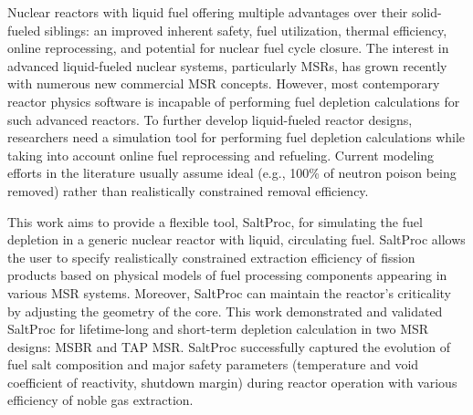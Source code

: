 Nuclear reactors with liquid fuel offering multiple advantages over their 
solid-fueled siblings: an improved inherent safety, fuel utilization, thermal 
efficiency, online reprocessing, and potential for nuclear fuel cycle closure. 
The interest in advanced liquid-fueled nuclear 
systems, particularly \glspl{MSR}, has grown recently with numerous new 
commercial \gls{MSR} concepts. 
However, most contemporary reactor physics software is incapable of performing 
fuel depletion calculations for such advanced reactors. To further 
develop liquid-fueled reactor designs, researchers need a simulation tool for 
performing fuel depletion calculations while taking into account online fuel 
reprocessing and refueling. Current modeling efforts in the literature usually 
assume ideal
(e.g., 100\% of neutron poison being removed) rather than 
realistically constrained removal
efficiency. 

This work aims to provide a flexible tool, SaltProc, for simulating 
the fuel depletion in a generic nuclear reactor with liquid, circulating fuel. 
SaltProc allows the user to specify realistically constrained extraction 
efficiency of fission products based on physical models of
fuel processing 
components appearing in various \gls{MSR} systems. Moreover, SaltProc can 
maintain the reactor's criticality by adjusting the geometry of the core. This 
work demonstrated and validated SaltProc for lifetime-long and short-term 
depletion calculation in two \gls{MSR} designs: \gls{MSBR} and \gls{TAP} 
\gls{MSR}. SaltProc successfully captured the evolution of fuel salt 
composition and major safety parameters (temperature and void coefficient of 
reactivity, shutdown margin) during reactor operation with various efficiency 
of noble gas extraction.